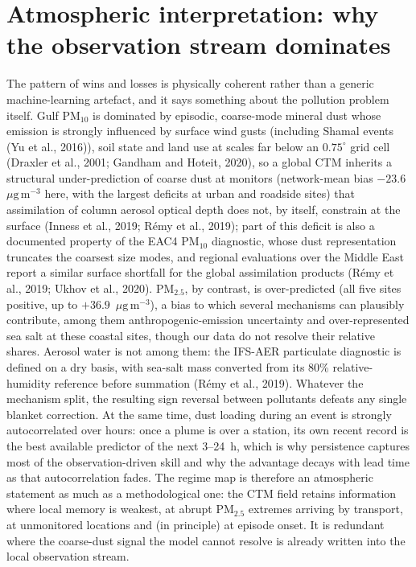 \documentclass[11pt]{article}
\newcommand*{\ugm}{\ensuremath{\mu\mathrm{g\,m^{-3}}}}
\newcommand*{\pmtf}{\ensuremath{\mathrm{PM_{2.5}}}}
\newcommand*{\pmten}{\ensuremath{\mathrm{PM_{10}}}}
\begin{document}
\section{Atmospheric interpretation: why the observation stream dominates}
The pattern of wins and losses is physically coherent rather than a generic machine-learning artefact, and it says something about the pollution problem itself. Gulf \pmten{} is dominated by episodic, coarse-mode mineral dust whose emission is strongly influenced by surface wind gusts (including Shamal events (Yu et al., 2016)), soil state and land use at scales far below an $0.75^\circ$ grid cell (Draxler et al., 2001; Gandham and Hoteit, 2020), so a global CTM inherits a structural under-prediction of coarse dust at monitors (network-mean bias $-23.6$~\ugm{} here, with the largest deficits at urban and roadside sites) that assimilation of column aerosol optical depth does not, by itself, constrain at the surface (Inness et al., 2019; R\'emy et al., 2019); part of this deficit is also a documented property of the EAC4 \pmten{} diagnostic, whose dust representation truncates the coarsest size modes, and regional evaluations over the Middle East report a similar surface shortfall for the global assimilation products (R\'emy et al., 2019; Ukhov et al., 2020). \pmtf{}, by contrast, is over-predicted (all five sites positive, up to $+36.9$~\ugm{}), a bias to which several mechanisms can plausibly contribute, among them anthropogenic-emission uncertainty and over-represented sea salt at these coastal sites, though our data do not resolve their relative shares. Aerosol water is not among them: the IFS-AER particulate diagnostic is defined on a dry basis, with sea-salt mass converted from its 80\% relative-humidity reference before summation (R\'emy et al., 2019). Whatever the mechanism split, the resulting sign reversal between pollutants defeats any single blanket correction. At the same time, dust loading during an event is strongly autocorrelated over hours: once a plume is over a station, its own recent record is the best available predictor of the next 3--24~h, which is why persistence captures most of the observation-driven skill and why the advantage decays with lead time as that autocorrelation fades. The regime map is therefore an atmospheric statement as much as a methodological one: the CTM field retains information where local memory is weakest, at abrupt \pmtf{} extremes arriving by transport, at unmonitored locations and (in principle) at episode onset. It is redundant where the coarse-dust signal the model cannot resolve is already written into the local observation stream.
\end{document}
